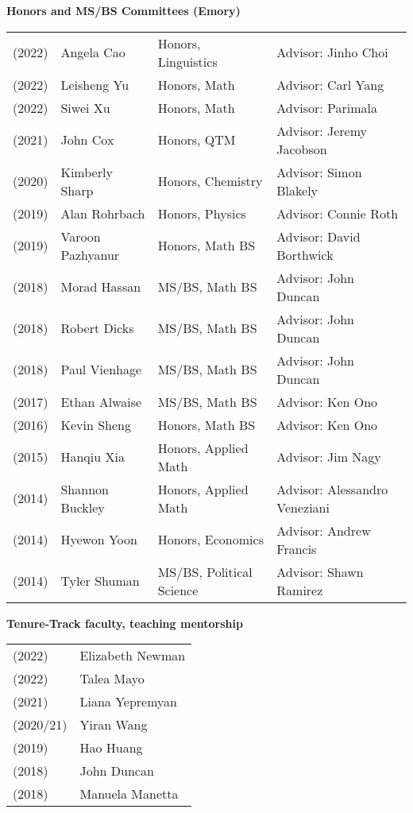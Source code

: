 \documentclass[margin,line]{res}
\begin{document}
\begin{resume}
{\bf Honors and MS/BS Committees (Emory)}
\vspace*{-.15in}

\begin{tabular}{llll}
(2022) & Angela Cao & Honors, Linguistics & Advisor: Jinho Choi\\
(2022) & Leisheng Yu & Honors, Math &  Advisor: Carl Yang\\
(2022) & Siwei Xu& Honors, Math &  Advisor: Parimala\\    
(2021) & John Cox  & Honors, QTM & Advisor: Jeremy Jacobson\\    
(2020) & Kimberly Sharp & Honors, Chemistry & Advisor: Simon Blakely\\  
(2019) & Alan Rohrbach & Honors, Physics & Advisor:  Connie Roth\\
(2019) & Varoon Pazhyanur & Honors, Math BS & Advisor:  David Borthwick\\
(2018) & Morad Hassan & MS/BS, Math BS & Advisor:  John Duncan\\
(2018) & Robert Dicks & MS/BS, Math BS & Advisor:  John Duncan\\
(2018) & Paul Vienhage & MS/BS, Math BS & Advisor:  John Duncan\\
(2017) & Ethan Alwaise & MS/BS, Math BS & Advisor:  Ken Ono\\
(2016) & Kevin Sheng & Honors, Math BS & Advisor:  Ken Ono \\
(2015) & Hanqiu Xia   & Honors, Applied Math & Advisor:  Jim Nagy\\
(2014) & Shannon Buckley & Honors, Applied Math & Advisor:  Alessandro Veneziani\\
(2014) & Hyewon Yoon & Honors, Economics & Advisor:  Andrew Francis\\
(2014) & Tyler Shuman & MS/BS, Political Science & Advisor:  Shawn Ramirez\\
\end{tabular}


{\bf Tenure-Track faculty, teaching mentorship}
\vspace*{-.15in}

\begin{tabular}{ll}
  (2022) & Elizabeth Newman \\
  (2022) & Talea Mayo \\  
  (2021) & Liana Yepremyan \\
  (2020/21) & Yiran Wang \\    
  (2019) & Hao Huang\\
  (2018) & John Duncan \\
  (2018) & Manuela Manetta 
\end{tabular}


\end{resume}
\end{document}
